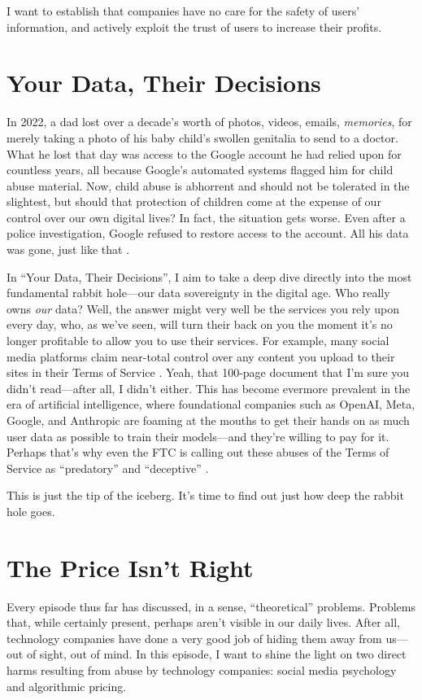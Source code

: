\documentclass[12pt]{article}
\begin{document}
I want to establish that companies have no care for the safety of users’
information, and actively exploit the trust of users to increase their profits.

\section{Your Data, Their Decisions}
In 2022, a dad lost over a decade's worth of photos, videos, emails,
\emph{memories}, for merely taking a photo of his baby child's swollen genitalia to
send to a doctor. What he lost that day was access to the Google account he had
relied upon for countless years, all because Google's automated systems flagged
him for child abuse material. Now, child abuse is abhorrent and should not be
tolerated in the slightest, but should that protection of children come at the
expense of our control over our own digital lives? In fact, the situation gets
worse. Even after a police investigation, Google refused to restore access to
the account. All his data was gone, just like that \autocite{Hill2022:DadTookPhotosHisNakedToddlerDoctor}.

In ``Your Data, Their Decisions'', I aim to take a deep dive directly into the
most fundamental rabbit hole---our data sovereignty in the digital age. Who
really owns \emph{our} data? Well, the answer might very well be the services
you rely upon every day, who, as we've seen, will turn their back on you the
moment it's no longer profitable to allow you to use their services. For
example, many social media platforms claim near-total control over any content
you upload to their sites in their Terms of Service
\autocite{Tanner2022:IAgreedWhat}. Yeah, that 100-page document that I'm sure
you didn't read---after all, I didn't either. This has become evermore prevalent
in the era of artificial intelligence, where foundational companies such as
OpenAI, Meta, Google, and Anthropic are foaming at the mouths to get their hands
on as much user data as possible to train their models---and they're willing to
pay for it. Perhaps that's why even the FTC is calling out these abuses of the
Terms of Service as ``predatory'' and ``deceptive''
\autocite{Crystal2024:AiCompanies}.

This is just the tip of the iceberg. It's time to find out just how deep the
rabbit hole goes.

\section{The Price Isn't Right}
Every episode thus far has discussed, in a sense, ``theoretical'' problems.
Problems that, while certainly present, perhaps aren't visible in our
daily lives. After all, technology companies have done a very good job of hiding
them away from us---out of sight, out of mind. In this episode, I want to shine
the light on two direct harms resulting from abuse by technology companies:
social media psychology and algorithmic pricing.
\end{document}
